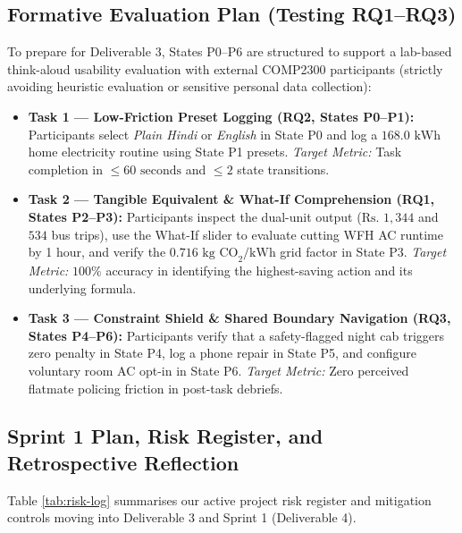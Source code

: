 \documentclass[12pt, a4paper]{article}
\begin{document}
\subsection{Formative Evaluation Plan (Testing RQ1--RQ3)}
To prepare for Deliverable 3, States P0--P6 are structured to support a lab-based think-aloud usability evaluation with external COMP2300 participants (strictly avoiding heuristic evaluation or sensitive personal data collection):
\begin{itemize}
    \item \textbf{Task 1 --- Low-Friction Preset Logging (\textbf{RQ2}, States P0--P1):} Participants select \textit{Plain Hindi} or \textit{English} in State P0 and log a $168.0\text{ kWh}$ home electricity routine using State P1 presets. \textit{Target Metric:} Task completion in $\le 60\text{ seconds}$ and $\le 2$ state transitions.
    \item \textbf{Task 2 --- Tangible Equivalent \& What-If Comprehension (\textbf{RQ1}, States P2--P3):} Participants inspect the dual-unit output ($\text{Rs. }1,344$ and $534$ bus trips), use the What-If slider to evaluate cutting WFH AC runtime by 1 hour, and verify the $0.716\text{ kg CO}_2\text{/kWh}$ grid factor in State P3. \textit{Target Metric:} $100\%$ accuracy in identifying the highest-saving action and its underlying formula.
    \item \textbf{Task 3 --- Constraint Shield \& Shared Boundary Navigation (\textbf{RQ3}, States P4--P6):} Participants verify that a safety-flagged night cab triggers zero penalty in State P4, log a phone repair in State P5, and configure voluntary room AC opt-in in State P6. \textit{Target Metric:} Zero perceived flatmate policing friction in post-task debriefs.
\end{itemize}

\subsection{Sprint 1 Plan, Risk Register, and Retrospective Reflection}
Table \ref{tab:risk-log} summarises our active project risk register and mitigation controls moving into Deliverable 3 and Sprint 1 (Deliverable 4).
\end{document}
